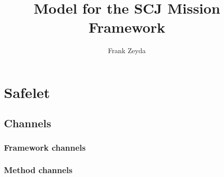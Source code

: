 \documentclass{article}
\title{{\Circus} Model for the SCJ Mission Framework}
\author{Frank Zeyda}
\begin{document}
\maketitle

\tableofcontents

\newpage




\newpage




\newpage


\section{Safelet}

\subsection{Channels}

\begin{circusbox}

\end{circusbox}

\subsubsection*{Framework channels}

\begin{circusbox}

\end{circusbox}

\subsubsection*{Method channels}
\end{document}
